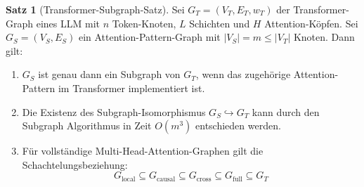 ﻿\documentclass[a4paper,12pt]{article}
\theoremstyle{definition}
\newtheorem{satz}{Satz}
\begin{document}
\begin{satz}[Transformer-Subgraph-Satz]
\label{satz:transformer_subgraph}
	Sei $G_T = (V_T, E_T, w_T)$ der Transformer-Graph eines LLM mit $n$ Token-Knoten,
	$L$ Schichten und $H$ Attention-Köpfen. Sei $G_S = (V_S, E_S)$ ein
	Attention-Pattern-Graph mit $|V_S| = m \leq |V_T|$ Knoten. Dann gilt:

	\begin{enumerate}
		\item $G_S$ ist genau dann ein Subgraph von $G_T$, wenn das zugehörige
		      Attention-Pattern im Transformer implementiert ist.
		\item Die Existenz des Subgraph-Isomorphismus $G_S \hookrightarrow G_T$
		      kann durch den Subgraph Algorithmus in Zeit $O(m^3)$ entschieden werden.
		\item Für vollständige Multi-Head-Attention-Graphen gilt die
		      Schachtelungsbeziehung:
		      \[
		      G_{\mathrm{local}} \subseteq G_{\mathrm{causal}} \subseteq G_{\mathrm{cross}} \subseteq G_{\mathrm{full}} \subseteq G_T
		      \]
	\end{enumerate}
\end{satz}
\end{document}
